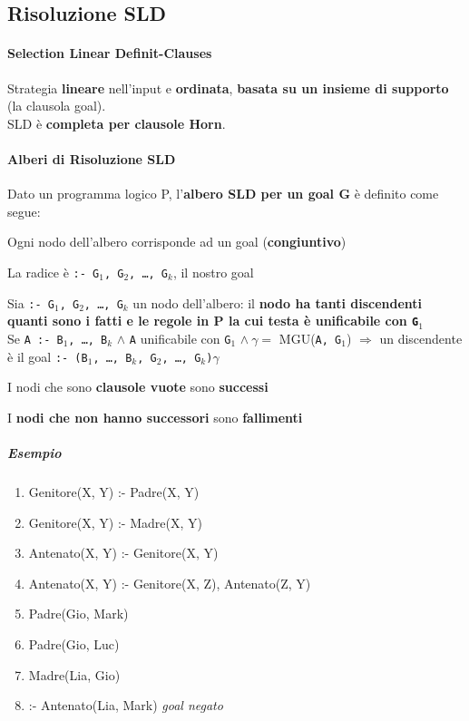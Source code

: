 \documentclass[10pt]{book}
\begin{document}
\subsection{Risoluzione SLD}
\paragraph{Selection Linear Definit-Clauses} Strategia \textbf{lineare} nell'input e  \textbf{ordinata}, \textbf{basata su un insieme di supporto} (la clausola goal).\\SLD è \textbf{completa per clausole Horn}.
\paragraph{Alberi di Risoluzione SLD} Dato un programma logico P, l'\textbf{albero SLD per un goal G} è definito come segue:
\begin{list}{}{}
	\item Ogni nodo dell'albero corrisponde ad un goal (\textbf{congiuntivo})
	\item La radice è \texttt{:- G$_1$, G$_2$, \ldots, G$_k$}, il nostro goal
	\item Sia \texttt{:- G$_1$, G$_2$, \ldots, G$_k$} un nodo dell'albero: il \textbf{nodo ha tanti discendenti quanti sono i fatti e le regole in P la cui testa è unificabile con \texttt{G$_1$}}\\
	Se \texttt{A :- B$_1$, \ldots, B$_k$} $\wedge$ \texttt{A} unificabile con \texttt{G$_1$} $\wedge\: \gamma =$ MGU(\texttt{A, G$_1$}) $\Rightarrow$ un discendente\\
	è il goal \texttt{:- (B$_1$, \ldots, B$_k$, G$_2$, \ldots, G$_k$)$\gamma$}
	\item I nodi che sono \textbf{clausole vuote} sono \textbf{successi}
	\item I \textbf{nodi che non hanno successori} sono \textbf{fallimenti}
\end{list}
\subparagraph{Esempio}
\begin{enumerate}
	\item Genitore(X, Y) :- Padre(X, Y)
	\item Genitore(X, Y) :- Madre(X, Y)
	\item Antenato(X, Y) :- Genitore(X, Y)
	\item Antenato(X, Y) :- Genitore(X, Z), Antenato(Z, Y)
	\item Padre(Gio, Mark)
	\item Padre(Gio, Luc)
	\item Madre(Lia, Gio)\\
	\item :- Antenato(Lia, Mark) \textit{goal negato}
\end{enumerate}
\end{document}
